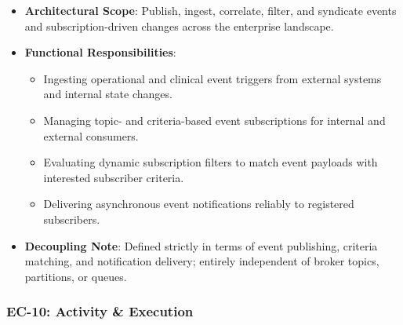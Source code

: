 \begin{itemize}

\item
\textbf{Architectural Scope}: Publish, ingest, correlate, filter, and syndicate events and subscription-driven changes across the enterprise landscape.



\item
\textbf{Functional Responsibilities}:


\begin{itemize}

\item
Ingesting operational and clinical event triggers from external systems and internal state changes.



\item
Managing topic- and criteria-based event subscriptions for internal and external consumers.



\item
Evaluating dynamic subscription filters to match event payloads with interested subscriber criteria.



\item
Delivering asynchronous event notifications reliably to registered subscribers.



\end{itemize}


\item
\textbf{Decoupling Note}: Defined strictly in terms of event publishing, criteria matching, and notification delivery; entirely independent of broker topics, partitions, or queues.



\end{itemize}
\label{rad:enterprise:184}
\subsubsection*{EC-10: Activity \& Execution}
\label{rad:enterprise:185}

